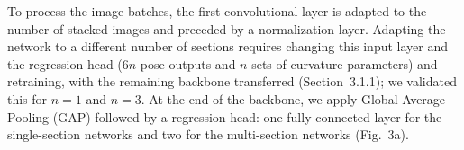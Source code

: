 To process the image batches, the first convolutional layer is adapted to the number of stacked images and preceded by a normalization layer. Adapting the network to a different number of sections requires changing this input layer and the regression head ($6n$ pose outputs and $n$ sets of curvature parameters) and retraining, with the remaining backbone transferred (Section~3.1.1); we validated this for $n = 1$ and $n = 3$. At the end of the backbone, we apply Global Average Pooling (GAP) followed by a regression head: one fully connected layer for the single-section networks and two for the multi-section networks (Fig.~3a).
